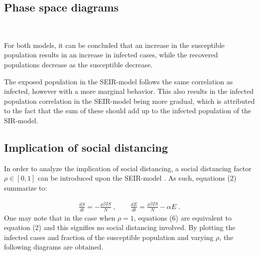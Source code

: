 \documentclass[12pt]{article}
\begin{document}
\subsection{Phase space diagrams}
\begin{figure*}[ht!]
\begin{center}
   \\
   \caption{\label{workflow} (a) SIR - $R_0 = 4$ (b) SEIR - $R_0 = 4$}
\end{center}
\end{figure*}
\noindent For both models, it can be concluded that an increase in the susceptible population results in an increase in infected cases, while the recovered populations decrease as the susceptible decrease. 

The exposed population in the SEIR-model follows the same correlation as infected, however with a more marginal behavior. This also results in the infected population correlation in the SEIR-model being more gradual, which is attributed to the fact that the sum of these should add up to the infected population of the SIR-model.
\newpage 
\subsection{Implication of social distancing}
In order to analyze the implication of social distancing, 
a social distancing factor $\rho \in [0,1]$ can be introduced upon the SEIR-model \cite{gill}. As such, equations (2) summarize to:

\begin{gather}
\frac{dS}{dt} = - \frac{\rho \beta I S}{N} \;, \qquad
\frac{dE}{dt} = \frac{\rho \beta I S}{N}- \alpha E \;.
\end{gather}
One may note that in the case when $\rho = 1$, equations (6) are equivalent to equation (2) and this signifies no social distancing involved. By plotting the infected cases and fraction of  the susceptible population and varying $\rho$, the following diagrams are obtained.

\begin{figure*}[ht!]
\begin{center}
   \\
   \caption{\label{workflow} (a) Infected cases (b) Susceptibility fraction}
\end{center}
\end{figure*}
\end{document}
